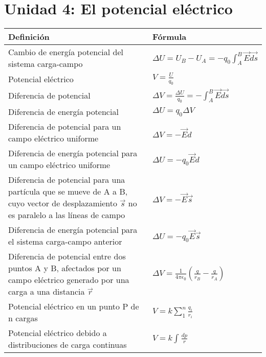 \documentclass[a4paper,12pt]{article}
\begin{document}
	\section{Unidad 4: El potencial eléctrico}
	\renewcommand{\arraystretch}{1.5}
	\begin{center}
		\begin{tabularx}{\textwidth}{|X|X|}
			\hline
			\textbf{Definición} & \textbf{Fórmula} \\ \hline
			Cambio de energía potencial del sistema carga-campo & $\Delta U = {U_B} - {U_A} = -{q_0} \int_{A}^{B} \vec{E} \vec{ds}$ \\ \hline
			Potencial eléctrico & $V = \frac{U}{q_0}$ \\ \hline
			Diferencia de potencial & $\Delta V = \frac{\Delta U}{q_0} = - \int_{A}^{B} \vec{E} \vec{ds}$ \\ \hline
			Diferencia de energía potencial & $\Delta U = {q_0}{\Delta V}$ \\ \hline
			Diferencia de potencial para un campo eléctrico uniforme & $\Delta V = -{\vec{E}} d$ \\ \hline
			Diferencia de energía potencial para un campo eléctrico uniforme & $\Delta U = -{q_0} \vec{E} d$ \\ \hline
			Diferencia de potencial para una partícula que se mueve de A a B, cuyo vector de desplazamiento $\vec{s}$ no es paralelo a las líneas de campo & $\Delta V = - \vec{E} \vec{s}$ \\ \hline
			Diferencia de energía potencial para el sistema carga-campo anterior & $\Delta U = -{q_0}{\vec{E}}{\vec{s}}$ \\ \hline
			Diferencia de potencial entre dos puntos A y B, afectados por un campo eléctrico generado por una carga a una distancia $\vec{r}$ & $\Delta V = \frac{1}{4 \pi \epsilon_0} ({\frac{q}{r_B}} - {\frac{q}{r_A}})$ \\ \hline
			Potencial eléctrico en un punto P de n cargas & $V = k \sum_{1}^{n} \frac{q_i}{r_i}$ \\ \hline
			Potencial eléctrico debido a distribuciones de carga continuas & $V = k \int_{} \frac{dp}{r}$ \\ \hline		
		\end{tabularx}
	\end{center}
\end{document}
